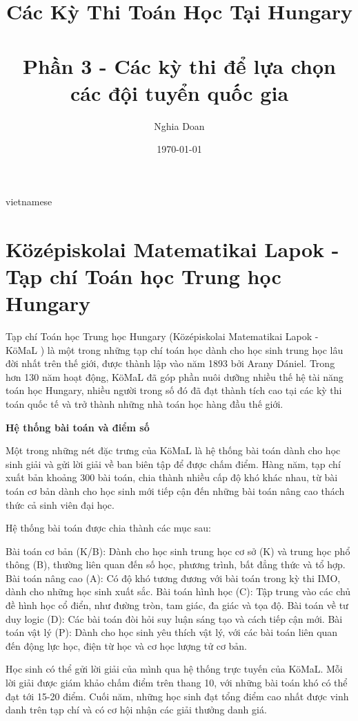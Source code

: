 \documentclass{article}
\title{Các Kỳ Thi Toán Học Tại Hungary\\ \quad \\Phần 3 - Các kỳ thi để lựa chọn các đội tuyển quốc gia}
\author{Nghia Doan}
\date{\today}
\begin{document}
\begin{otherlanguage*}{vietnamese}

\maketitle

\section{Középiskolai Matematikai Lapok - Tạp chí Toán học Trung học Hungary}

Tạp chí Toán học Trung học Hungary (Középiskolai Matematikai Lapok - KöMaL \cite{KoMaL}) là một trong những tạp chí toán học dành cho học sinh trung học lâu đời nhất trên thế giới,
được thành lập vào năm 1893 bởi Arany Dániel. Trong hơn 130 năm hoạt động, KöMaL đã góp phần nuôi dưỡng nhiều thế hệ tài năng toán học Hungary,
nhiều người trong số đó đã đạt thành tích cao tại các kỳ thi toán quốc tế và trở thành những nhà toán học hàng đầu thế giới.

\textbf{Hệ thống bài toán và điểm số}

Một trong những nét đặc trưng của KöMaL là hệ thống bài toán dành cho học sinh giải và gửi lời giải về ban biên tập để được chấm điểm.
Hàng năm, tạp chí xuất bản khoảng 300 bài toán, chia thành nhiều cấp độ khó khác nhau,
từ bài toán cơ bản dành cho học sinh mới tiếp cận đến những bài toán nâng cao thách thức cả sinh viên đại học.

Hệ thống bài toán được chia thành các mục sau:
\begin{itemize}[topsep=0pt, partopsep=0pt, itemsep=0pt]
    \ii Bài toán cơ bản (K/B): Dành cho học sinh trung học cơ sở (K) và trung học phổ thông (B), thường liên quan đến số học, phương trình, bất đẳng thức và tổ hợp.
    \ii Bài toán nâng cao (A): Có độ khó tương đương với bài toán trong kỳ thi IMO, dành cho những học sinh xuất sắc.
    \ii Bài toán hình học (C): Tập trung vào các chủ đề hình học cổ điển, như đường tròn, tam giác, đa giác và tọa độ.
    \ii Bài toán về tư duy logic (D): Các bài toán đòi hỏi suy luận sáng tạo và cách tiếp cận mới.
    \ii Bài toán vật lý (P): Dành cho học sinh yêu thích vật lý, với các bài toán liên quan đến động lực học, điện từ học và cơ học lượng tử cơ bản.
\end{itemize}

Học sinh có thể gửi lời giải của mình qua hệ thống trực tuyến của KöMaL. Mỗi lời giải được giám khảo chấm điểm trên thang 10, với những bài toán khó có thể đạt tới 15-20 điểm.
Cuối năm, những học sinh đạt tổng điểm cao nhất được vinh danh trên tạp chí và có cơ hội nhận các giải thưởng danh giá.


\end{otherlanguage*}
\end{document}

